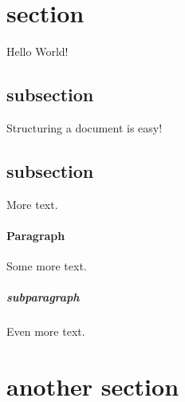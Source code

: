 \documentclass{article}
\begin{document}
	\section{section}
	Hello World!
	\subsection{subsection}
	Structuring a document is easy!
	\subsection{subsection}
	More text.
	\paragraph{Paragraph}
	Some more text.
	\subparagraph{subparagraph}
	Even more text.
	\section{another section}
\end{document}
